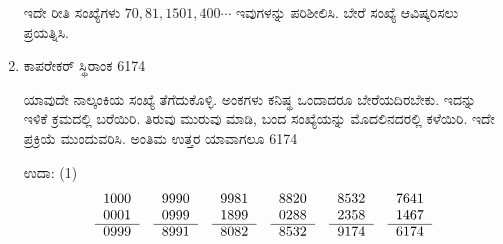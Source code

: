 \begin{enumerate}
ಇದೇ ರೀತಿ ಸಂಖ್ಯೆಗಳು $70, 81, 1501, 400 \cdots$ ಇವುಗಳನ್ನು ಪರಿಶೀಲಿಸಿ. ಬೇರೆ ಸಂಖ್ಯೆ ಆವಿಷ್ಕರಿಸಲು ಪ್ರಯತ್ನಿಸಿ. 

\item ಕಾಪರೇಕರ್ ಸ್ಥಿರಾಂಕ 6174

ಯಾವುದೇ ನಾಲ್ಕಂಕಿಯ ಸಂಖ್ಯೆ ತೆಗೆದುಕೊಳ್ಳಿ. ಅಂಕಗಳು ಕನಿಷ್ಥ ಒಂದಾದರೂ ಬೇರೆಯದಿರಬೇಕು. ಇದನ್ನು ಇಳಿಕೆ ಕ್ರಮದಲ್ಲಿ ಬರೆಯಿರಿ. ತಿರುವು ಮುರುವು ಮಾಡಿ, ಬಂದ ಸಂಖ್ಯೆಯನ್ನು ಮೊದಲಿನದರಲ್ಲಿ ಕಳೆಯಿರಿ. ಇದೇ ಪ್ರಕ್ರಿಯೆ ಮುಂದುವರಿಸಿ. ಅಂತಿಮ ಉತ್ತರ ಯಾವಾಗಲೂ 6174

ಉದಾ: (1)
\begin{equation*}
\begin{tabular}[t]{r}
1000 \\
0001\\\cline{1-1} 
0999
\end{tabular}
\quad
\begin{tabular}[t]{r}
9990\\ 
0999\\\cline{1-1} 
8991
\end{tabular}
\quad
\begin{tabular}[t]{r}
9981\\ 
1899\\\cline{1-1} 
8082
\end{tabular}
\quad
\begin{tabular}[t]{r}
8820\\ 
0288\\\cline{1-1} 
8532
\end{tabular}
\quad
\begin{tabular}[t]{r}
8532\\ 
2358\\\cline{1-1} 
9174
\end{tabular}
\quad
\begin{tabular}[t]{r}
7641\\ 
1467\\\cline{1-1} 
6174
\end{tabular}
\end{equation*}


\end{enumerate}
